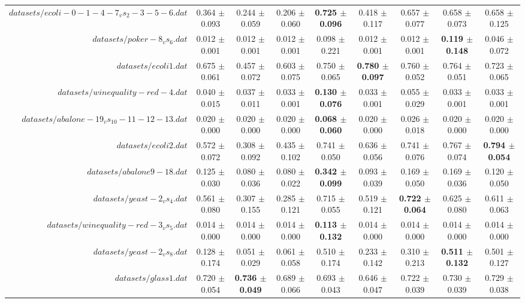 \begin{table}[!ht]
{\begin{tabular}{r c c c c c c c c}
$datasets/ecoli-0-1-4-7_vs_2-3-5-6.dat$ & 0.364 $\pm$ 0.093 & 0.244 $\pm$ 0.059 & 0.206 $\pm$ 0.060 & \textbf{0.725 $\pm$ 0.096} & 0.418 $\pm$ 0.117 & 0.657 $\pm$ 0.077 & 0.658 $\pm$ 0.073 & 0.658 $\pm$ 0.125 \\
$datasets/poker-8_vs_6.dat$ & 0.012 $\pm$ 0.001 & 0.012 $\pm$ 0.001 & 0.012 $\pm$ 0.001 & 0.098 $\pm$ 0.221 & 0.012 $\pm$ 0.001 & 0.012 $\pm$ 0.001 & \textbf{0.119 $\pm$ 0.148} & 0.046 $\pm$ 0.072 \\
$datasets/ecoli1.dat$ & 0.675 $\pm$ 0.061 & 0.457 $\pm$ 0.072 & 0.603 $\pm$ 0.075 & 0.750 $\pm$ 0.065 & \textbf{0.780 $\pm$ 0.097} & 0.760 $\pm$ 0.052 & 0.764 $\pm$ 0.051 & 0.723 $\pm$ 0.065 \\
$datasets/winequality-red-4.dat$ & 0.040 $\pm$ 0.015 & 0.037 $\pm$ 0.011 & 0.033 $\pm$ 0.001 & \textbf{0.130 $\pm$ 0.076} & 0.033 $\pm$ 0.001 & 0.055 $\pm$ 0.029 & 0.033 $\pm$ 0.001 & 0.033 $\pm$ 0.001 \\
$datasets/abalone-19_vs_10-11-12-13.dat$ & 0.020 $\pm$ 0.000 & 0.020 $\pm$ 0.000 & 0.020 $\pm$ 0.000 & \textbf{0.068 $\pm$ 0.060} & 0.020 $\pm$ 0.000 & 0.026 $\pm$ 0.018 & 0.020 $\pm$ 0.000 & 0.020 $\pm$ 0.000 \\
$datasets/ecoli2.dat$ & 0.572 $\pm$ 0.072 & 0.308 $\pm$ 0.092 & 0.435 $\pm$ 0.102 & 0.741 $\pm$ 0.050 & 0.636 $\pm$ 0.056 & 0.741 $\pm$ 0.076 & 0.767 $\pm$ 0.074 & \textbf{0.794 $\pm$ 0.054} \\
$datasets/abalone9-18.dat$ & 0.125 $\pm$ 0.030 & 0.080 $\pm$ 0.036 & 0.080 $\pm$ 0.022 & \textbf{0.342 $\pm$ 0.099} & 0.093 $\pm$ 0.039 & 0.169 $\pm$ 0.050 & 0.169 $\pm$ 0.036 & 0.120 $\pm$ 0.050 \\
$datasets/yeast-2_vs_4.dat$ & 0.561 $\pm$ 0.080 & 0.307 $\pm$ 0.155 & 0.285 $\pm$ 0.121 & 0.715 $\pm$ 0.055 & 0.519 $\pm$ 0.121 & \textbf{0.722 $\pm$ 0.064} & 0.625 $\pm$ 0.080 & 0.611 $\pm$ 0.063 \\
$datasets/winequality-red-3_vs_5.dat$ & 0.014 $\pm$ 0.000 & 0.014 $\pm$ 0.000 & 0.014 $\pm$ 0.000 & \textbf{0.113 $\pm$ 0.132} & 0.014 $\pm$ 0.000 & 0.014 $\pm$ 0.000 & 0.014 $\pm$ 0.000 & 0.014 $\pm$ 0.000 \\
$datasets/yeast-2_vs_8.dat$ & 0.128 $\pm$ 0.174 & 0.051 $\pm$ 0.029 & 0.061 $\pm$ 0.058 & 0.510 $\pm$ 0.174 & 0.233 $\pm$ 0.142 & 0.310 $\pm$ 0.213 & \textbf{0.511 $\pm$ 0.132} & 0.501 $\pm$ 0.127 \\
$datasets/glass1.dat$ & 0.720 $\pm$ 0.054 & \textbf{0.736 $\pm$ 0.049} & 0.689 $\pm$ 0.066 & 0.693 $\pm$ 0.043 & 0.646 $\pm$ 0.047 & 0.722 $\pm$ 0.039 & 0.730 $\pm$ 0.039 & 0.729 $\pm$ 0.038 \\

\end{tabular}}
\end{table}

